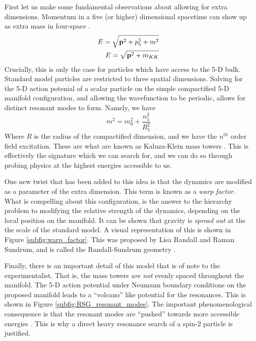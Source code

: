 \documentclass[12pt]{article}
\begin{document}
First let us make some fundamental observations about allowing for extra
dimensions. Momentum in a five (or higher) dimensional spacetime can show up as
extra mass in four-space \cite{KALUZA_2018, bsm}. 
\begin{align}
    E = \sqrt{\vb{p}^2 + p_5^5 + m^2} \\
    E = \sqrt{\vb{p}^2 + m_{KK}}
\end{align}
Crucially, this is only the case for particles which have access to the 5-D
bulk. Standard model particles are restricted to three spatial dimensions.
Solving for the 5-D action potenial of a scalar particle on the simple
compactified 5-D manifold configuration, and allowing the wavefunction to be
periodic, allows for distinct resonant modes to form. Namely, we have
\begin{equation}
    m^2 = m_0^2 + \frac{n_5^2}{R_5^2}
\end{equation}
Where $R$ is the radius of the compactified dimension, and we have the $n^{th}$
order field excitation. These are what are known as Kaluza-Klein mass towers
\cite{KALUZA_2018, bsm}. This is effectively the signature which we can search
for, and we can do so through probing physics at the highest energies accessible
to us.

One new twist that has been added to this idea is that the dynamics are modified
as a parameter of the extra dimension. This term is known as a \textit{warp
factor}. What is compelling about this configuration, is the answer to the
hierarchy problem to modifying the relative strength of the dynamics, depending
on the local position on the manifold. It can be shown that gravity is
\textit{spread out} at the the scale of the standard model. A visual
representation of this is shown in Figure \ref{subfig:warp_factor}. This was
proposed by Lisa Randall and Raman Sundrum, and is called the Randall-Sundrum
geometry \cite{RandallSundrumOriginal, bsm}.

Finally, there is an important detail of this model that is of note to the
experimentalist. That is, the mass towers \textit{are not} evenly spaced
throughout the manifold. The 5-D action potential under Neumann boundary
conditions on the proposed manifold leads to a ``volcano'' like potential for
the resonances. This is shown in Figure \ref{subfig:RSG_resonant_modes}. The
important phenomenological consequence is that the resonant modes are ``pushed''
towards more accessible energies \cite{RandallSundrumOriginal, bsm}. This is why
a direct heavy resonance search of a spin-2 particle is justified.
\end{document}
